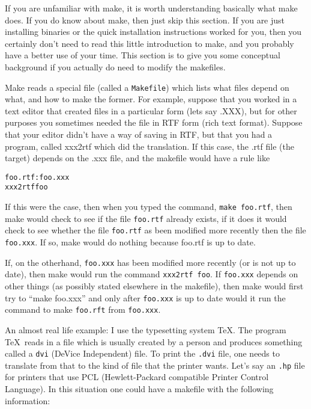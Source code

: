 \documentclass[%
	11pt,
        a4paper,
        twoside]{workrep}
\newcommand*{\prg}[1]{\textsf{#1}}		%
\newcommand*{\cmd}[1]{\texttt{#1}}		%
\newcommand*{\file}[1]{\texttt{#1}}		%
\begin{document}
If you are unfamiliar with \prg{make}, it is worth understanding basically
what make does.  If you do know about \prg{make}, then just skip this
section.   If you are just installing binaries or the quick installation
instructions worked for you, then you certainly don't need to read
this little introduction to \prg{make}, and you probably have a
better use of your time.  This section is to give you some
conceptual background if you actually do need to modify the makefiles.

\prg{Make} reads a special file (called a \file{Makefile})
which lists what files
depend on what, and how to make the former.  For example, suppose
that you worked in a text editor that created files in a particular
form (lets say .XXX), but for other purposes you sometimes needed the
file in RTF form (rich text format).  Suppose that your editor didn't
have a way of saving in RTF, but that you had a program, called
xxx2rtf which did the translation.  If this case, the .rtf file (the
target) depends on the .xxx file, and the makefile would have a rule
like

\begin{alltt}
foo.rtf:        foo.xxx
                xxx2rtf foo
\end{alltt}

If this were the case, then when you typed the command, \cmd{make
foo.rtf}, then make would check to see if the file \file{foo.rtf}
already exists, if it does it would check to see whether the file
\file{foo.rtf} as been modified more recently then the file \file{foo.xxx}.
If so, make would do nothing because foo.rtf is up to date.

If, on the otherhand, \file{foo.xxx} has been modified more recently (or is
not up to date), then make would run the command  \cmd{xxx2rtf foo}.
If \file{foo.xxx} depends on other things (as possibly stated elsewhere in the
makefile), then make would first try to ``make foo.xxx'' and only after
\file{foo.xxx} is up to date would it run the command to make \file{foo.rft}
from \file{foo.xxx}.

An almost real life example: I use the typesetting system \TeX.  The
program \TeX\ reads in a file which is usually created by a person
and produces something called a \file{dvi} (DeVice Independent) file.
To print the \file{.dvi} file, one needs to translate from that to
the kind of file that the printer wants.  Let's say an \file{.hp}
file for printers that use PCL (Hewlett-Packard compatible Printer
Control Language).  In this situation one could have a makefile with
the following information:
\end{document}
